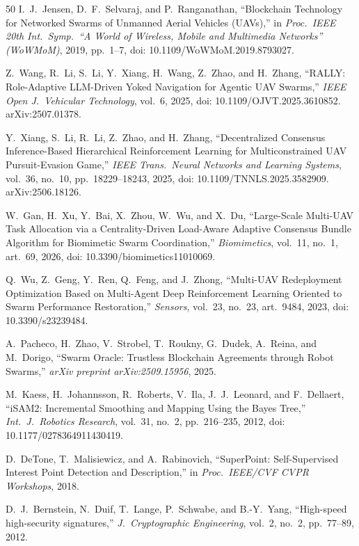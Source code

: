 \documentclass[conference,10pt]{IEEEtran}
\begin{document}
\begin{thebibliography}{50}
I.~J.~Jensen, D.~F.~Selvaraj, and P.~Ranganathan,
``Blockchain Technology for Networked Swarms of Unmanned Aerial Vehicles (UAVs),''
in \emph{Proc.\ IEEE 20th Int.\ Symp.\ ``A World of Wireless, Mobile and Multimedia Networks'' (WoWMoM)}, 2019, pp.~1--7,
doi: 10.1109/WoWMoM.2019.8793027.

Z.~Wang, R.~Li, S.~Li, Y.~Xiang, H.~Wang, Z.~Zhao, and H.~Zhang,
``RALLY: Role-Adaptive LLM-Driven Yoked Navigation for Agentic UAV Swarms,''
\emph{IEEE Open J.\ Vehicular Technology}, vol.~6, 2025,
doi: 10.1109/OJVT.2025.3610852. arXiv:2507.01378.

Y.~Xiang, S.~Li, R.~Li, Z.~Zhao, and H.~Zhang,
``Decentralized Consensus Inference-Based Hierarchical Reinforcement Learning for Multiconstrained UAV Pursuit-Evasion Game,''
\emph{IEEE Trans.\ Neural Networks and Learning Systems}, vol.~36, no.~10, pp.~18229--18243, 2025,
doi: 10.1109/TNNLS.2025.3582909. arXiv:2506.18126.

W.~Gan, H.~Xu, Y.~Bai, X.~Zhou, W.~Wu, and X.~Du,
``Large-Scale Multi-UAV Task Allocation via a Centrality-Driven Load-Aware Adaptive Consensus Bundle Algorithm for Biomimetic Swarm Coordination,''
\emph{Biomimetics}, vol.~11, no.~1, art.~69, 2026,
doi: 10.3390/biomimetics11010069.

Q.~Wu, Z.~Geng, Y.~Ren, Q.~Feng, and J.~Zhong,
``Multi-UAV Redeployment Optimization Based on Multi-Agent Deep Reinforcement Learning Oriented to Swarm Performance Restoration,''
\emph{Sensors}, vol.~23, no.~23, art.~9484, 2023,
doi: 10.3390/s23239484.

A.~Pacheco, H.~Zhao, V.~Strobel, T.~Roukny, G.~Dudek, A.~Reina, and M.~Dorigo,
``Swarm Oracle: Trustless Blockchain Agreements through Robot Swarms,''
\emph{arXiv preprint arXiv:2509.15956}, 2025.

M.~Kaess, H.~Johannsson, R.~Roberts, V.~Ila, J.~J.~Leonard, and F.~Dellaert,
``iSAM2: Incremental Smoothing and Mapping Using the Bayes Tree,''
\emph{Int.\ J.\ Robotics Research}, vol.~31, no.~2, pp.~216--235, 2012,
doi: 10.1177/0278364911430419.

D.~DeTone, T.~Malisiewicz, and A.~Rabinovich,
``SuperPoint: Self-Supervised Interest Point Detection and Description,''
in \emph{Proc.\ IEEE/CVF CVPR Workshops}, 2018.

D.~J.~Bernstein, N.~Duif, T.~Lange, P.~Schwabe, and B.-Y.~Yang,
``High-speed high-security signatures,''
\emph{J.\ Cryptographic Engineering}, vol.~2, no.~2, pp.~77--89, 2012.


\end{thebibliography}
\end{document}
